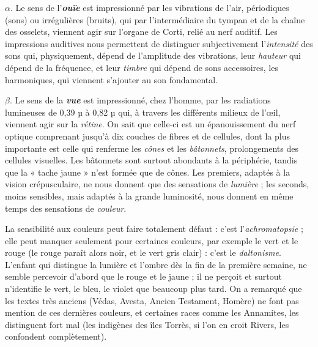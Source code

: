 $\alpha$. Le sens de l’\textbf{\textit {ouïe}} est impressionné par les vibrations de l'air,
périodiques (sons) ou irrégulières (bruits), qui par l’intermédiaire du
tympan et de la chaîne des osselets, viennent agir sur l’organe de
Corti, relié au nerf auditif. Les impressions auditives nous permettent
de distinguer subjectivement l'{\it intensité} des sons qui, physiquement,
dépend de l'amplitude des vibrations, leur {\it hauteur} qui dépend de la
fréquence, et leur {\it timbre} qui dépend de sons accessoires, les harmoniques,
qui viennent s’ajouter au son fondamental.

$\beta$. Le sens de la \textbf{\textit {vue}} est impressionné, chez l’homme, par les
radiations lumineuses de 0,39 µ à 0,82 µ qui, à travers les différents
milieux de l’œil, viennent agir sur la {\it rétine}. On sait que celle-ci est un
épanouissement du nerf optique comprenant jusqu’à dix couches
de fibres et de cellules, dont la plus importante est celle qui renferme
les {\it cônes} et les {\it bâtonnets}, prolongements des cellules visuelles. Les
bâtonnets sont surtout abondants à la périphérie, tandis que la « tache
jaune » n’est formée que de cônes. Les premiers, adaptés à la vision
crépusculaire, ne nous donnent que des sensations de {\it lumière} ; les
seconds, moins sensibles, mais adaptés à la grande luminosité, nous
donnent en même temps des sensations de {\it couleur}.

\vspace{0.24cm}
{\footnotesize 
La sensibilité aux couleurs peut faire totalement défaut : c’est
l’{\it achromatopsie} ; elle peut manquer seulement pour certaines couleurs, par exemple
le vert et le rouge (le rouge paraît alors noir, et le vert gris clair) : c’est le
{\it daltonisme}. L'enfant qui distingue la lumière et l'ombre dès la fin de la
première semaine, ne semble percevoir d’abord que le rouge et le jaune ; il
ne perçoit et surtout n’identifie le vert, le bleu, le violet que beaucoup plus
tard. On a remarqué que les textes très anciens (Védas, Avesta, Ancien
Testament, Homère) ne font pas mention de ces dernières couleurs, et
certaines races comme les Annamites, les distinguent fort mal (les indigènes
des îles Torrès, si l’on en croit Rivers, les confondent complètement).}
\vspace{0.31cm}

